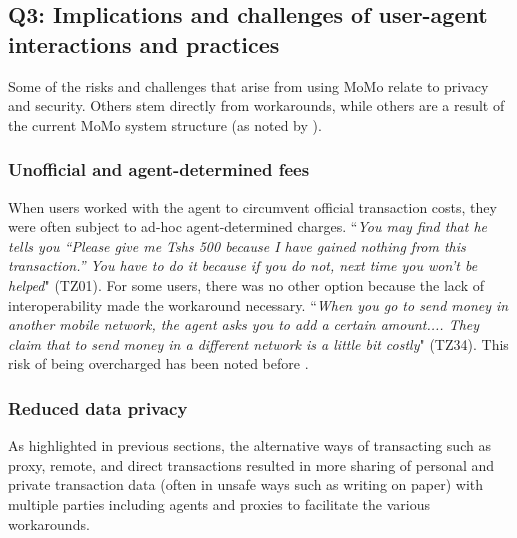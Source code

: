 \subsection{Q3: Implications and challenges of user-agent interactions and  practices} 
\label{sec:risksandchallenges}
Some of the risks and challenges that arise from using MoMo relate to privacy and security. Others stem directly from workarounds, while others are a result of the current MoMo system structure (as noted by \cite{mogaji2022dark}).

\subsubsection{Unofficial and agent-determined fees}
When users worked with the agent to circumvent official transaction costs, they were often subject to ad-hoc agent-determined charges. ``\textit{You may find that he tells you “Please give me Tshs 500 because I have gained nothing from this transaction.” You have to do it because if you do not, next time you won’t be helped}" (TZ01). For some users, there was no other option because the lack of interoperability made the workaround necessary. ``\textit{When you go to send money in another mobile network, the agent asks you to add a certain amount.... They claim that to send money in a different network is a little bit costly}" (TZ34). This risk of being overcharged has been noted before \cite{martin2019mobile,mogaji2022dark}.  

\subsubsection{Reduced data privacy}
As highlighted in previous sections, the alternative ways of transacting such as proxy,  remote, and direct transactions resulted in more sharing of personal and private transaction data (often in unsafe ways such as writing on paper) with multiple parties including agents and proxies to facilitate the various workarounds. 

